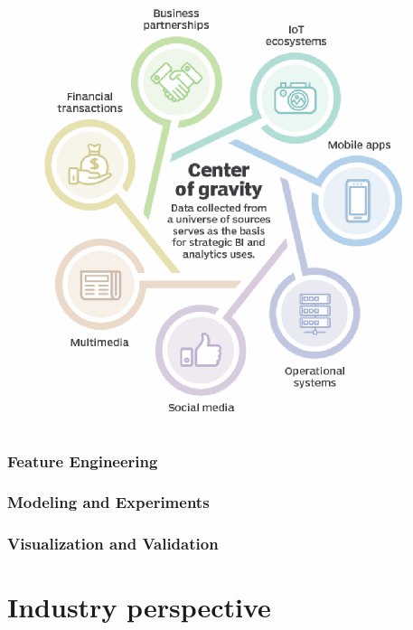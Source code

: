 \documentclass[aspectratio=169,xcolor=x11names,table]{beamer}
\begin{document}
\begin{frame}
\begin{columns}
\begin{column}{0.3\linewidth}
\begin{figure}
				\includegraphics[width=\columnwidth]{data_collect}
			\end{figure}
		\end{column}
	\end{columns}
\end{frame}

\begin{frame}
	\frametitle{Feature Engineering}
	
\end{frame}

\begin{frame}
	\frametitle{Modeling and Experiments}
	
\end{frame}

\begin{frame}
	\frametitle{Visualization and Validation}
	
\end{frame}

\section{Industry perspective}
\end{document}
